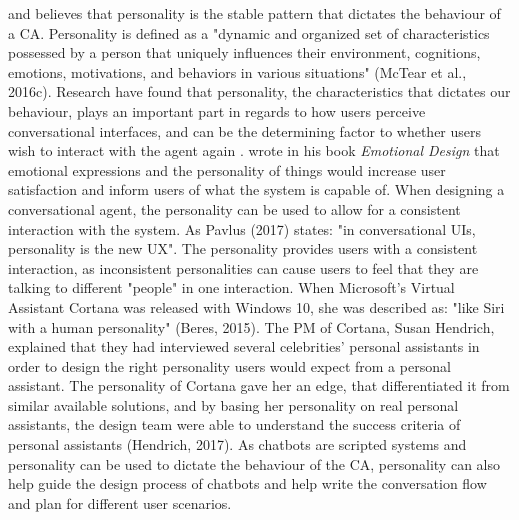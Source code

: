 \cite{callejas2011} and \cite{Xiao2005} believes that personality is the stable pattern that dictates the behaviour of a CA. Personality is defined as a "dynamic and organized set of characteristics possessed by a person that uniquely influences their environment, cognitions, emotions, motivations, and behaviors in various situations" \citep{McTear2016b} (McTear et al., 2016c). Research have found that personality, the characteristics that dictates our behaviour, plays an important part in regards to how users perceive conversational interfaces, and can be the determining factor to whether users wish to interact with the agent again \citep{callejas2011}. \cite{Norman2007} wrote in his book \textit{Emotional Design} that emotional expressions and the personality of things would increase user satisfaction and inform users of what the system is capable of. When designing a conversational agent, the personality can be used to allow for a consistent interaction with the system. As \cite{pavlus2017} Pavlus (2017) states: "in conversational UIs, personality is the new UX". The personality provides users with a consistent interaction, as inconsistent personalities can cause users to feel that they are talking to different "people" in one interaction. When Microsoft's Virtual Assistant Cortana was released with Windows 10, she was described as: "like Siri with a human personality" \citep{beres2015} (Beres, 2015). The PM of Cortana, Susan Hendrich, explained that they had interviewed several celebrities' personal assistants in order to design the right personality users would expect from a personal assistant. The personality of Cortana gave her an edge, that differentiated it from similar available solutions, and by basing her personality on real personal assistants, the design team were able to understand the success criteria of personal assistants (Hendrich, 2017). As chatbots are scripted systems and personality can be used to dictate the behaviour of the CA, personality can also help guide the design process of chatbots and help write the conversation flow and plan for different user scenarios.


